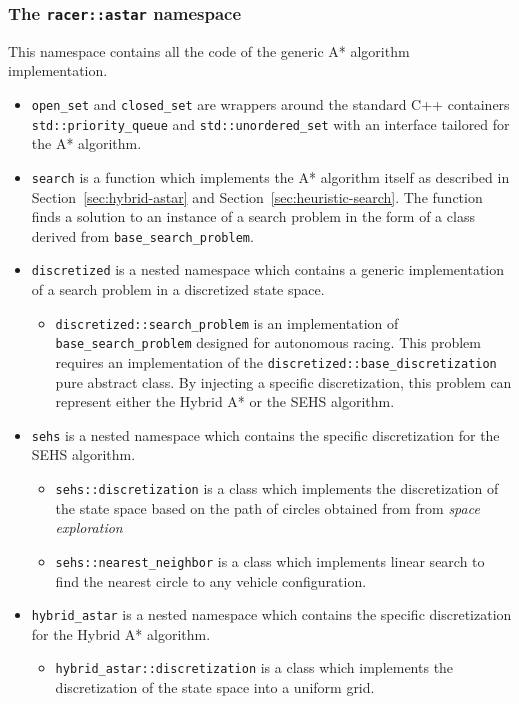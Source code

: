 \subsubsection{The \texttt{racer::astar} namespace}

This namespace contains all the code of the generic A* algorithm implementation.

\begin{itemize}	
	\item \texttt{open\_set} and \texttt{closed\_set} are wrappers around the standard C++ containers \texttt{std::priority\_queue} and \texttt{std::unordered\_set} with an interface tailored for the A* algorithm.

	\item \texttt{search} is a function which implements the A* algorithm itself as described in Section~\ref{sec:hybrid-astar} and Section~\ref{sec:heuristic-search}. The function finds a solution to an instance of a search problem in the form of a class derived from \texttt{base\-\_search\-\_problem}.
	
	\item \texttt{discretized} is a nested namespace which contains a generic implementation of a search problem in a discretized state space.
	\begin{itemize}
		\item \texttt{discretized::search\_problem} is an implementation of \texttt{base\-\_search\-\_problem} designed for autonomous racing. This problem requires an implementation of the \texttt{discretized::base\_discretization} pure abstract class. By injecting a specific discretization, this problem can represent either the Hybrid A* or the \gls*{SEHS} algorithm.
	\end{itemize}
	
	\item \texttt{sehs} is a nested namespace which contains the specific discretization for the \gls{SEHS} algorithm.
	\begin{itemize}
		\item \texttt{sehs::discretization} is a class which implements the discretization of the state space based on the path of circles obtained from from \textit{space exploration}
		\item \texttt{sehs::nearest\_neighbor} is a class which implements linear search to find the nearest circle to any vehicle configuration.
	\end{itemize}

	\item \texttt{hybrid\_astar} is a nested namespace which contains the specific discretization for the Hybrid A* algorithm.
	\begin{itemize}
		\item \texttt{hybrid\_astar::discretization} is a class which implements the discretization of the state space into a uniform grid.
	\end{itemize}
\end{itemize}

